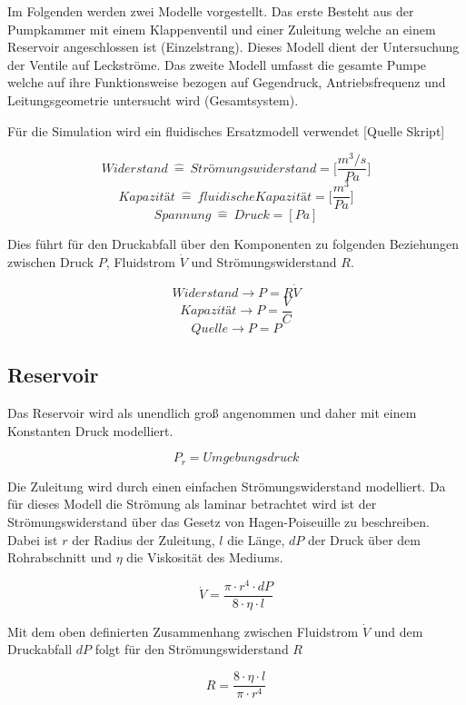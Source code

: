 \documentclass[fontsize=12pt, a4paper]{scrartcl}
\begin{document}
Im Folgenden werden zwei Modelle vorgestellt. Das erste Besteht aus der Pumpkammer mit einem Klappenventil und einer Zuleitung welche an einem Reservoir angeschlossen ist (Einzelstrang). Dieses Modell dient der Untersuchung der Ventile auf Leckströme. Das zweite Modell umfasst die gesamte Pumpe welche auf ihre Funktionsweise bezogen auf Gegendruck, Antriebsfrequenz und Leitungsgeometrie untersucht wird (Gesamtsystem).

Für die Simulation wird ein fluidisches Ersatzmodell verwendet [Quelle Skript]

\[ Widerstand \:\widehat{=}\:  Strömungswiderstand = \biggl[\frac{m^3/s}{Pa}\biggr] \]
\[ Kapazität  \:\widehat{=}\:  fluidische Kapazität = \biggl[\frac{m^3}{Pa}\biggr] \]
\[ Spannung  \:\widehat{=}\:  Druck = [Pa] \]

Dies führt für den Druckabfall über den Komponenten zu folgenden Beziehungen zwischen Druck \(P\), Fluidstrom \(\dot{V}\) und Strömungswiderstand \(R\).

\[Widerstand \rightarrow P = R\dot{V} \]
\[Kapazität \rightarrow P = \frac{V}{C} \]
\[Quelle \rightarrow P = P \]

\subsection{Reservoir}
\label{subsec:reservoirsection}
Das Reservoir wird als unendlich groß angenommen und daher mit einem Konstanten Druck modelliert.


\[ P_r = Umgebungsdruck \]

Die Zuleitung wird durch einen einfachen Strömungswiderstand modelliert. Da für dieses Modell die Strömung als laminar betrachtet wird ist der Strömungswiderstand über das Gesetz von Hagen-Poiseuille zu beschreiben. Dabei ist \( r \) der Radius der Zuleitung, \(l\) die Länge, \(dP\) der Druck über dem Rohrabschnitt und \(\eta\) die Viskosität des Mediums.

\begin{equation}
	\dot{V} = \frac{\pi \cdot r^4 \cdot dP}{8 \cdot \eta \cdot l}
\end{equation}

Mit dem oben definierten Zusammenhang zwischen Fluidstrom \(\dot{V}\) und dem Druckabfall \(dP\) folgt für den Strömungswiderstand \(R\)

\begin{equation}
	R = \frac{8 \cdot \eta \cdot l}{\pi \cdot r^4}
\label{eq:leckagestrom}
\end{equation}
\end{document}
